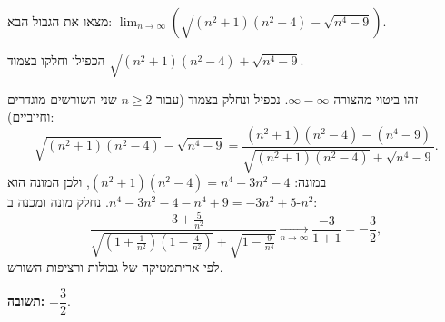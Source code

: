 
\begin{question}
מצאו את הגבול הבא:
$\displaystyle \lim_{n\to\infty}\left(\sqrt{(n^2+1)(n^2-4)}-\sqrt{n^4-9}\right)$.
\end{question}

\begin{hint}
הכפילו וחלקו בצמוד $\sqrt{(n^2+1)(n^2-4)}+\sqrt{n^4-9}$.
\end{hint}

\begin{solution}
זהו ביטוי מהצורה $\infty-\infty$. נכפיל ונחלק בצמוד (עבור $n\ge 2$ שני השורשים מוגדרים וחיוביים):
\[ \sqrt{(n^2+1)(n^2-4)}-\sqrt{n^4-9} = \frac{(n^2+1)(n^2-4)-(n^4-9)}{\sqrt{(n^2+1)(n^2-4)}+\sqrt{n^4-9}}. \]
במונה: $(n^2+1)(n^2-4) = n^4-3n^2-4$, ולכן המונה הוא $n^4-3n^2-4-n^4+9 = -3n^2+5$. נחלק מונה ומכנה ב-$n^2$:
\[ \frac{-3+\frac{5}{n^2}}{\sqrt{\left(1+\frac{1}{n^2}\right)\left(1-\frac{4}{n^2}\right)}+\sqrt{1-\frac{9}{n^4}}} \xrightarrow[n\to\infty]{} \frac{-3}{1+1} = -\frac{3}{2}, \]
לפי אריתמטיקה של גבולות ורציפות השורש.

\textbf{תשובה:} $-\dfrac32$.
\end{solution}
